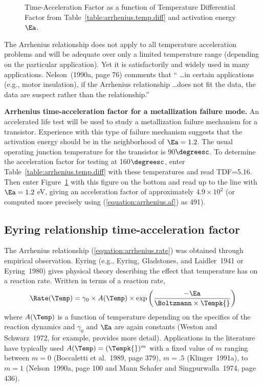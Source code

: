 \begin{figure}
\caption{Time-Acceleration Factor as a function of Temperature
Differential Factor from Table~\protect\ref{table:arrhenius.temp.diff}
and activation energy $\Ea$.}
\label{figure:arrhenius.af.ps}
\end{figure}
The Arrhenius relationship does not apply to all temperature
acceleration problems and will be adequate over only a limited
temperature range (depending on the particular application). Yet it is
satisfactorily and widely used in many applications. Nelson~(1990a, page 76)
comments that `` \dots in certain applications
(e.g., motor insulation), if the Arrhenius relationship \dots does
not fit the data, the data are suspect rather than the relationship.''

\begin{example}{\bf Arrhenius time-acceleration factor for a metallization 
failure mode.}
\label{example:arrhenius.af}
An accelerated life test will be used to study a metallization
failure mechanism for a transistor. Experience with this type of failure
mechanism suggests that the activation energy should be in the
neighborhood of $\Ea=1.2$. The usual operating junction temperature
for the transistor is 90$\degreesc$. To determine the acceleration
factor for testing at 160$\degreesc$, enter
Table~\ref{table:arrhenius.temp.diff} with these temperatures and
read TDF=5.16. Then enter Figure~\ref{figure:arrhenius.af.ps} with
this figure on the bottom and read up to the line with $\Ea=1.2$ eV,
giving an acceleration factor of approximately $4.9 \times 10^{2}$
(or computed more precisely using (\ref{equation:arrhenius.af}) as
491).
\end{example}

\subsection{Eyring relationship time-acceleration factor}
\label{section:eyring.af}
The Arrhenius relationship (\ref{equation:arrhenius.rate}) was
obtained through empirical observation.  Eyring (e.g., Eyring,
Gladstones, and Laidler~1941 or Eyring~1980) gives physical theory
describing the effect that temperature
has on a reaction rate.  Written in terms of a reaction rate,
\begin{displaymath}
\Rate(\Temp)=\gamma_{0} \times A(\Temp) \times \exp\left(
\frac{-\Ea}{\Boltzmann\times
\Tempk{}} \right)
\end{displaymath}
where $A(\Temp)$ is a function of temperature depending on the
specifics of the reaction dynamics and $\gamma_{0}$ and $\Ea$ are
again constants (Weston and Schwarz~1972, for example, provides more
detail). Applications in the literature have typically used
$A(\Temp)= (\Tempk{})^{m}$ with a fixed value of $m$ ranging between
$m=0$ (Boccaletti et al.~1989, page 379), $m=.5$ (Klinger~1991a), to
$m=1$ (Nelson~1990a, page 100 and Mann Schafer and
Singpurwalla~1974, page 436).

